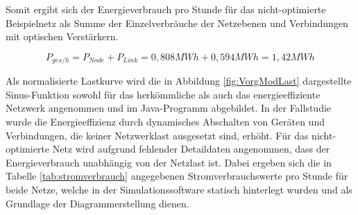 Somit ergibt sich der Energieverbrauch pro Stunde für das nicht-optimierte Beispielnetz als Summe der Einzelverbräuche der Netzebenen und Verbindungen mit optischen Verstärkern.

 \begin{equation}
P_{ges/h} = P_{Node} + P_{Link} = 0,808 MWh + 0,594 MWh = 1,42 MWh
 \end{equation}


Als normalisierte Lastkurve wird die in Abbildung \ref{fig:VorgModLast} dargestellte Sinus-Funktion sowohl für das her\-kömm\-liche als auch das energieeffiziente Netzwerk angenommen und im Java-Programm abgebildet. In der Fallstudie wurde die Energieeffizienz durch dynamisches Abschalten von Geräten und Verbindungen, die keiner Netzwerklast ausgesetzt sind, erhöht.\cite[3]{Chiaraviglio2009} Für das nicht-optimierte Netz wird aufgrund fehlender Detaildaten angenommen, dass der Energieverbrauch unabhängig von der Netzlast ist. Dabei ergeben sich die in Tabelle \ref{tab:stromverbrauch} angegebenen Stromverbrauchswerte pro Stunde für beide Netze, welche in der Simulationssoftware statisch hinterlegt wurden und als Grundlage der Diagrammerstellung dienen.

